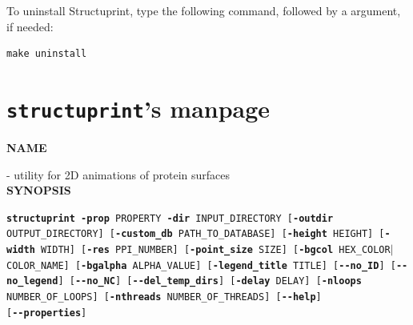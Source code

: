 \documentclass[12pt,a4paper]{article}
\begin{document}
To uninstall Structuprint, type the following command, followed by a 
 argument, if needed:
\begin{lstlisting}[numbers=none]
make uninstall
\end{lstlisting}

\newpage

\section{\texttt{structuprint}'s manpage}
\textbf{\large{NAME}}

 - utility for 2D animations of protein surfaces\\

\textbf{\large{SYNOPSIS}}

\texttt{\textbf{structuprint} \textbf{-prop} PROPERTY\newline
\hspace*{2.66cm} \textbf{-dir} INPUT\_DIRECTORY\newline
\hspace*{2.66cm} [\textbf{-outdir} OUTPUT\_DIRECTORY]\newline
\hspace*{2.66cm} [\textbf{-custom\_db} PATH\_TO\_DATABASE]\newline
\hspace*{2.66cm} [\textbf{-height} HEIGHT] [\textbf{-width} WIDTH]\newline
\hspace*{2.66cm} [\textbf{-res} PPI\_NUMBER]\newline
\hspace*{2.66cm} [\textbf{-point\_size} SIZE]\newline
\hspace*{2.66cm} [\textbf{-bgcol} HEX\_COLOR$|$COLOR\_NAME] [\textbf{-bgalpha} ALPHA\_VALUE]\newline
\hspace*{2.66cm} [\textbf{-legend\_title} TITLE]\newline
\hspace*{2.66cm} [\textbf{-{}-no\_ID}] [\textbf{-{}-no\_legend}] [\textbf{-{}-no\_NC}]\newline
\hspace*{2.66cm} [\textbf{-{}-del\_temp\_dirs}]\newline
\hspace*{2.66cm} [\textbf{-delay} DELAY]\newline
\hspace*{2.66cm} [\textbf{-nloops} NUMBER\_OF\_LOOPS]\newline
\hspace*{2.66cm} [\textbf{-nthreads} NUMBER\_OF\_THREADS]\newline
\hspace*{2.66cm} [\textbf{-{}-help}]\\
\hspace*{2.66cm} [\textbf{-{}-properties}]}\\
\end{document}
